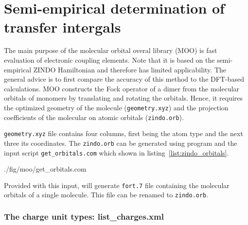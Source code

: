 \section{Semi-empirical determination of transfer intergals}
\label{sec:moo}

\newcommand{\xyz}{\texttt{geometry.xyz}\xspace}
\newcommand{\orb}{\texttt{zindo.orb}\xspace}


The main purpose of the molecular orbital overal library (MOO) is fast evaluation of electronic coupling elements. Note that it is based on the semi-empirical ZINDO Hamiltonian and therefore has limited applicability. The general advice is to first compare the accuracy of this method to the DFT-based calculations. MOO constructs the Fock operator of a dimer from the  molecular orbitals of monomers by translating and rotating the orbitals. Hence, it requires the optimized geometry of the molecule (\xyz) and the projection coefficients of the molecular on atomic orbitals (\orb). 

\xyz file contains four columns, first being the atom type and the next three its coordinates. The \orb can be generated using \gaussian program and the input script \texttt{get\_orbitals.com} which shown in listing~\ref{list:zindo_orbitals}.

%
{./fig/moo/get_orbitals.com}

Provided with this input, \gaussian will generate \texttt{fort.7} file containing the molecular orbitals of a single molecule. This file can be renamed to \orb. 

\subsubsection{The charge unit types: list\_charges.xml}


